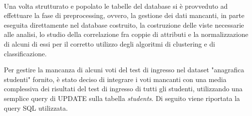 \documentclass[]{article}
\begin{document}
\paragraph{}
Una volta strutturato e popolato le tabelle del database si \`{e} provveduto ad effettuare la fase di preprocessing, ovvero, la gestione dei dati mancanti, in parte eseguita direttamente nel database costruito, la costruzione delle viste necessarie alle analisi, lo studio della correlazione fra coppie di attributi e la normalizzazione di alcuni di essi per il corretto utilizzo degli algoritmi di clustering e di classificazione. 

Per gestire la mancanza di alcuni voti del test di ingresso nel dataset "anagrafica studenti" fornito, \`{e} stato deciso di integrare i voti mancanti con una media complessiva dei risultati del test di ingresso di tutti gli studenti, utilizzando una semplice query di UPDATE sulla tabella \textit{students}. Di seguito viene riportata la query SQL utilizzata.


\end{document}
